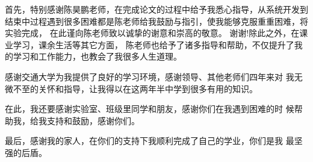 \begin{thanks}
首先，特别感谢陈昊鹏老师，在完成论文的过程中给予我悉心指导，从系统开发到结束中过程遇到很多困难都是陈老师给我鼓励与指引，使我能够克服重重困难，将实验完成，
在此谨向陈老师致以诚挚的谢意和崇高的敬意。 谢谢!除此之外，在课业学习，课余生活等其它方面，
陈老师也给予了诸多指导和帮助，不仅提升了我的学习和工作能力，也教会了我很多人生道理。

感谢交通大学为我提供了良好的学习环境，感谢领导、其他老师们四年来对 我无微不至的关怀和指导，让我得以在这两年半中学到很多有用的知识。

在此，我还要感谢实验室、班级里同学和朋友，感谢你们在我遇到困难的时 候帮助我，给我支持和鼓励，感谢你们。

最后，感谢我的家人，在你们的支持下我顺利完成了自己的学业，你们是我 最坚强的后盾。
\end{thanks}
